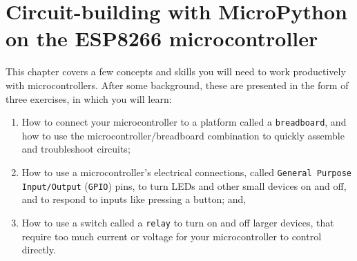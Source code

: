 \setchapterpreamble[u]{\margintoc}
\chapter{Circuit-building with MicroPython on the ESP8266 microcontroller}
This chapter covers a few concepts and skills you will need to work productively with microcontrollers. After some background, these are presented in the form of three exercises, in which you will learn: 
\begin{enumerate}
	\item How to connect your microcontroller to a platform called a \texttt{breadboard}, and how to use the microcontroller/breadboard combination to quickly assemble and troubleshoot circuits;
	\item How to use a microcontroller's electrical connections, called \texttt{General Purpose Input/Output} (\texttt{GPIO}) pins, to turn LEDs and other small devices on and off, and to respond to inputs like pressing a button; and,
	\item How to use a switch called a \texttt{relay} to turn on and off larger devices, that require too much current or voltage for your microcontroller to control directly.
\end{enumerate}


